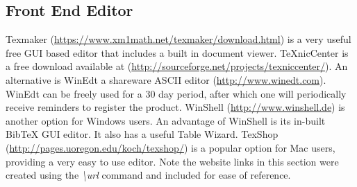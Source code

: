 \subsection{Front End Editor}
Texmaker (\url{https://www.xm1math.net/texmaker/download.html}) is a very useful free GUI based editor that includes a built in document viewer. TeXnicCenter is a free download available at (\url{http://sourceforge.net/projects/texniccenter/}). An alternative is WinEdt a shareware ASCII editor (\url{http://www.winedt.com}). WinEdt can be freely used for a 30 day period, after which one will periodically receive reminders to register the product. WinShell (\url{http://www.winshell.de}) is another option for Windows users. An advantage of WinShell is its in-built BibTeX GUI editor. It also has a useful Table Wizard. TexShop (\url{http://pages.uoregon.edu/koch/texshop/}) is a popular option for Mac users, providing a very easy to use editor. Note the website links in this section were created using the \emph{\textbackslash url} command and included for ease of reference. 

